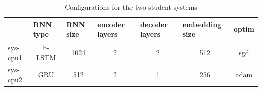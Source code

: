 \documentclass[11pt,a4paper]{article}
\begin{document}
\begin{table}[]
\centering
\begin{tabular}{lcccccc}
\hline
     & \multicolumn{1}{l}{RNN type} & \multicolumn{1}{l}{RNN size} & \multicolumn{1}{l}{encoder layers} & \multicolumn{1}{l}{decoder layers} & \multicolumn{1}{l}{embedding size} & \multicolumn{1}{l}{optim} \\ \hline
sys-cpu1 & b-LSTM                         & 1024                         & 2                                  & 2                                  & 512                                & sgd                       \\ \hline
sys-cpu2 & GRU                          & 512                          & 2                                  & 1                                  & 256                                & adam                      \\ \hline
\end{tabular}
\caption{Configurations for the two student systems}
\label{table:config}
\end{table}
\end{document}
